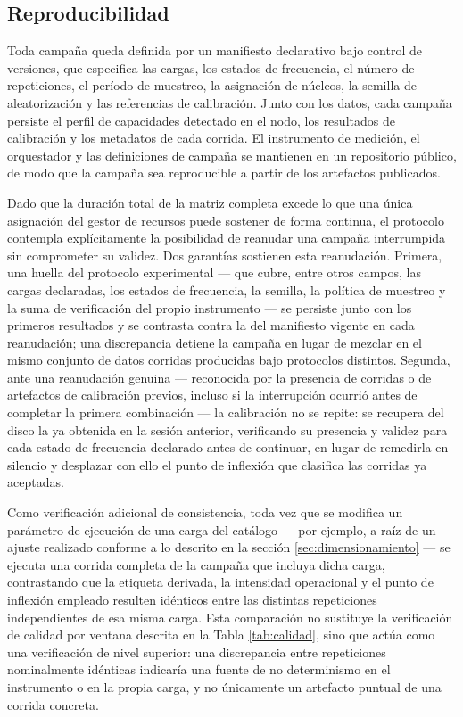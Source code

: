 \documentclass[12pt,oneside,spanish]{book}
\begin{document}
\subsection{Reproducibilidad}

Toda campaña queda definida por un manifiesto declarativo bajo control de versiones, que especifica las cargas, los estados de frecuencia, el número de repeticiones, el período de muestreo, la asignación de núcleos, la semilla de aleatorización y las referencias de calibración. Junto con los datos, cada campaña persiste el perfil de capacidades detectado en el nodo, los resultados de calibración y los metadatos de cada corrida. El instrumento de medición, el orquestador y las definiciones de campaña se mantienen en un repositorio público, de modo que la campaña sea reproducible a partir de los artefactos publicados.

Dado que la duración total de la matriz completa excede lo que una única asignación del gestor de recursos puede sostener de forma continua, el protocolo contempla explícitamente la posibilidad de reanudar una campaña interrumpida sin comprometer su validez. Dos garantías sostienen esta reanudación. Primera, una huella del protocolo experimental --- que cubre, entre otros campos, las cargas declaradas, los estados de frecuencia, la semilla, la política de muestreo y la suma de verificación del propio instrumento --- se persiste junto con los primeros resultados y se contrasta contra la del manifiesto vigente en cada reanudación; una discrepancia detiene la campaña en lugar de mezclar en el mismo conjunto de datos corridas producidas bajo protocolos distintos. Segunda, ante una reanudación genuina --- reconocida por la presencia de corridas o de artefactos de calibración previos, incluso si la interrupción ocurrió antes de completar la primera combinación --- la calibración no se repite: se recupera del disco la ya obtenida en la sesión anterior, verificando su presencia y validez para cada estado de frecuencia declarado antes de continuar, en lugar de remedirla en silencio y desplazar con ello el punto de inflexión que clasifica las corridas ya aceptadas.

Como verificación adicional de consistencia, toda vez que se modifica un parámetro de ejecución de una carga del catálogo --- por ejemplo, a raíz de un ajuste realizado conforme a lo descrito en la sección \ref{sec:dimensionamiento} --- se ejecuta una corrida completa de la campaña que incluya dicha carga, contrastando que la etiqueta derivada, la intensidad operacional y el punto de inflexión empleado resulten idénticos entre las distintas repeticiones independientes de esa misma carga. Esta comparación no sustituye la verificación de calidad por ventana descrita en la Tabla \ref{tab:calidad}, sino que actúa como una verificación de nivel superior: una discrepancia entre repeticiones nominalmente idénticas indicaría una fuente de no determinismo en el instrumento o en la propia carga, y no únicamente un artefacto puntual de una corrida concreta.
\end{document}
